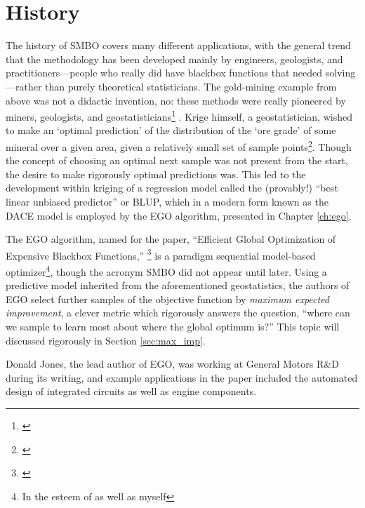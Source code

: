 \section{History}

The history of SMBO covers many different applications, with the general trend that the methodology has been developed mainly by engineers, geologists, and practitioners---people who really did have blackbox functions that needed solving---rather than purely theoretical statisticians. The gold-mining example from above was not a didactic invention, no: these methods were really pioneered by miners, geologists, and geostatisticians\footnote{\cite{cressie_kriging_1990}} . Krige himself, a geostatistician, wished to make an `optimal prediction' of the distribution of the `ore grade' of some mineral over a given area, given a relatively small set of sample points\footnote{\cite{krige}}. Though the concept of choosing an optimal next sample was not present from the start, the desire to make rigorously optimal predictions was. This led to the development within kriging of a regression model called the (provably!) ``best linear unbiased predictor'' or BLUP, which in a modern form known as the DACE model is employed by the EGO algorithm, presented in Chapter \ref{ch:ego}.

The EGO algorithm, named for the paper, ``Efficient Global Optimization of Expensive Blackbox Functions,'' \footnote{\cite{jones_efficient_1998}} is a paradigm sequential model-based optimizer\footnote{In the esteem of \cite{hutter_sequential_2011} as well as myself}, though the acronym SMBO did not appear until later. Using a predictive model inherited from the aforementioned geostatistics, the authors of EGO select further samples of the objective function by \emph{maximum expected improvement}, a clever metric which rigorously answers the question, ``where can we sample to learn most about where the global optimum is?'' This topic will discussed rigorously in Section \ref{sec:max_imp}.

 Donald Jones, the lead author of EGO, was working at General Motors R\&D during its writing, and example applications in the paper included the automated design of integrated circuits as well as engine components.

